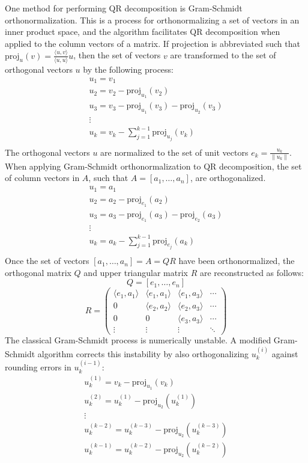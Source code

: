 \documentclass{article}
\begin{document}
One method for performing QR decomposition is Gram-Schmidt orthonormalization. This is a process for orthonormalizing a set of vectors in an inner product space, and the algorithm facilitates QR decomposition when applied to the column vectors of a matrix. If projection is abbreviated such that $\mathrm{proj}_u(v)=\frac{\langle u,v \rangle}{\langle u,u \rangle}u$, then the set of vectors $v$ are transformed to the set of orthogonal vectors $u$ by the following process:
$$\begin{array}{l}
u_1=v_1\\
u_2=v_2-\mathrm{proj}_{u_1}(v_2)\\
u_3=v_3-\mathrm{proj}_{u_1}(v_3)-\mathrm{proj}_{u_2}(v_3)\\
\vdots\\
u_k=v_k-\sum_{j=1}^{k-1}\mathrm{proj}_{u_j}(v_k)\\
\end{array}$$
The orthogonal vectors $u$ are normalized to the set of unit vectors $e_k=\frac{u_k}{\|u_k\|}$. When applying Gram-Schmidt orthonormalization to QR decomposition, the set of column vectors in $A$, such that $A=[a_1,\ldots,a_n]$, are orthogonalized.
$$\begin{array}{l}
u_1=a_1\\
u_2=a_2-\mathrm{proj}_{e_1}(a_2)\\
u_3=a_3-\mathrm{proj}_{e_1}(a_3)-\mathrm{proj}_{e_2}(a_3)\\
\vdots\\
u_k=a_k-\sum_{j=1}^{k-1}\mathrm{proj}_{e_j}(a_k)\\
\end{array}$$
Once the set of vectors $[a_1,\ldots,a_n]=A=QR$ have been orthonormalized, the orthogonal matrix $Q$ and upper triangular matrix $R$ are reconstructed as follows:
$$Q=[e_1,\ldots,e_n]$$
$$R=\left(\begin{array}{cccc}
\langle e_1,a_1 \rangle & \langle e_1,a_1 \rangle & \langle e_1,a_3 \rangle & \cdots \\
0 & \langle e_2,a_2 \rangle & \langle e_2,a_3 \rangle & \cdots \\
0 & 0 & \langle e_3,a_3 \rangle & \cdots \\
\vdots & \vdots & \vdots & \ddots
\end{array}\right)$$
The classical Gram-Schmidt process is numerically unstable. A modified Gram-Schmidt algorithm corrects this instability by also orthogonalizing $u_k^{(i)}$ against rounding errors in $u_k^{(i-1)}$:
$$\begin{array}{l}
u_k^{(1)}=v_k-\mathrm{proj}_{u_1}(v_k)\\
u_k^{(2)}=u_k^{(1)}-\mathrm{proj}_{u_2}(u_k^{(1)})\\
\vdots\\
u_k^{(k-2)}=u_k^{(k-3)}-\mathrm{proj}_{u_2}(u_k^{(k-3)})\\
u_k^{(k-1)}=u_k^{(k-2)}-\mathrm{proj}_{u_2}(u_k^{(k-2)})\\
\end{array}$$
\end{document}

